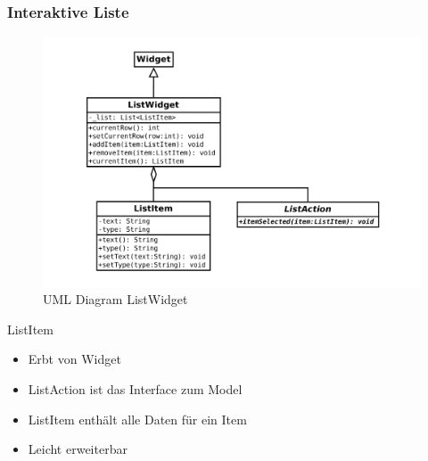\begin{frame}
	\frametitle{Interaktive Liste}
%
	\begin{minipage}{0.49\textwidth}
		\begin{figure}
			\centering
			\includegraphics[width = \textwidth]{../grafiken/uml-list-widget}
			\caption{UML Diagram ListWidget}
		\end{figure}
	\end{minipage}
%
	\begin{minipage}{0.44\textwidth}
		\begin{block}{ListItem}
			\begin{itemize}
			    \item Erbt von Widget
			    \item ListAction ist das Interface zum Model
			    \item ListItem enthält alle Daten für ein Item
			    \item Leicht erweiterbar
			\end{itemize}
		\end{block}
	\end{minipage}
\end{frame}